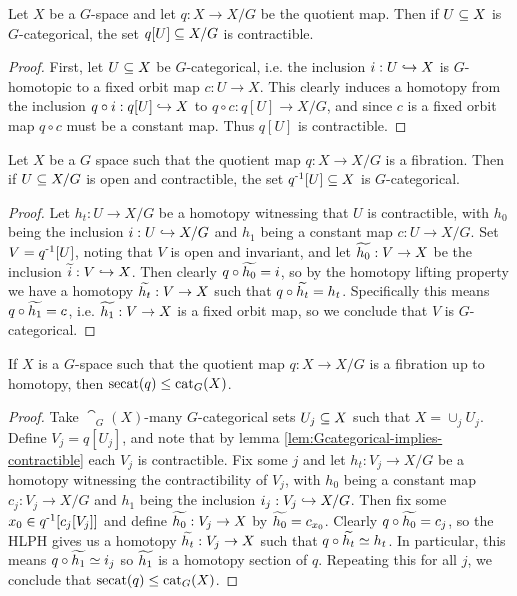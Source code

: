 \begin{lemma}\label{lem:Gcategorical-implies-contractible}
    Let $X$ be a $G$-space and let $q : X \to X/G$ be the quotient map.
    Then if $U \sub X$ is $G$-categorical, the set $q[U] \sub X/G$ is contractible.
    \begin{proof}
        First, let $U \sub X$ be $G$-categorical, i.e. the inclusion $i : U \ito X$ is $G$-homotopic to a fixed orbit map $c : U \to X$.
        This clearly induces a homotopy from the inclusion $q \circ i : q[U] \ito X$ to $q \circ c : q[U] \to X/G$, and since $c$ is a fixed orbit map $q \circ c$ must be a constant map.
        Thus $q[U]$ is contractible.
    \end{proof}
\end{lemma}

\begin{lemma}\label{contractible-implies-Gcategorical}
    Let $X$ be a $G$ space such that the quotient map $q : X \to X/G$ is a fibration.
    Then if $U \sub X/G$ is open and contractible, the set $\inv{q}[U] \sub X$ is $G$-categorical.
    \begin{proof}
        Let $h_t : U \to X/G$ be a homotopy witnessing that $U$ is contractible, with $h_0$ being the inclusion $i : U \ito X/G$ and $h_1$ being a constant map $c : U \to X/G$.
        Set $V = \inv{q}[U]$, noting that $V$ is open and invariant, and let $\Tilde{h_0} : V \to X$ be the inclusion $\Tilde{i} : V \ito X$.
        Then clearly $q \circ \Tilde{h_0} = i$, so by the homotopy lifting property we have a homotopy $\Tilde{h_t} : V \to X$ such that $q \circ \Tilde{h_t} = h_t$.
        Specifically this means $q \circ \Tilde{h_1} = c$, i.e. $\Tilde{h_1} : V \to X$ is a fixed orbit map, so we conclude that $V$ is $G$-categorical.
    \end{proof}
\end{lemma}

\begin{proposition}
    If $X$ is a $G$-space such that the quotient map $q : X \to X/G$ is a fibration up to homotopy, then $\secat(q) \leq \cat_G(X)$.
    \begin{proof}
        Take $\cat_G(X)$-many $G$-categorical sets $U_j \sub X$ such that $X = \cup_j U_j$.
        Define $V_j = q[U_j]$, and note that by lemma \ref{lem:Gcategorical-implies-contractible} each $V_j$ is contractible.
        Fix some $j$ and let $h_t : V_j \to X/G$ be a homotopy witnessing the contractibility of $V_j$, with $h_0$ being a constant map $c_j : V_j \to X/G$ and $h_1$ being the inclusion $i_j : V_j \ito X/G$.
        Then fix some $x_0 \in \inv{q}[c_j[V_j]]$ and define $\Tilde{h_0} : V_j \to X$ by $\Tilde{h_0} = c_{x_0}$.
        Clearly $q \circ \Tilde{h_0} = c_j$, so the HLPH gives us a homotopy $\Tilde{h_t} : V_j \to X$ such that $q \circ \Tilde{h_t} \simeq h_t$.
        In particular, this means $q \circ \Tilde{h_1} \simeq i_j$ so $\Tilde{h_1}$ is a homotopy section of $q$.
        Repeating this for all $j$, we conclude that $\secat(q) \leq \cat_G(X)$.
    \end{proof}
\end{proposition}

